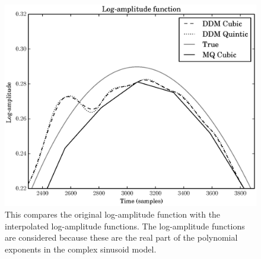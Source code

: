 \begin{figure}[!t]
    \centering
    \includegraphics[width=\figwidthscale\textwidth]{plots/mq_mod_err_comp_logamp_func.eps}
    \caption{This compares the original log-amplitude function with the
    interpolated log-amplitude functions. The log-amplitude functions are
    considered because these are the real part of the polynomial exponents in
    the complex sinusoid model.
    \label{plot:mqmoderrcomplogampfunc}}
\end{figure}


